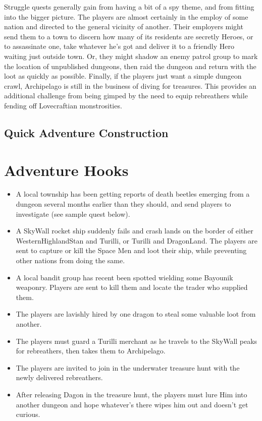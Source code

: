\documentclass[12pt,a4paper,twocolumn]{article}
\begin{document}
\begin{itemize}
Struggle quests generally gain from having a bit of a spy theme, and from fitting into the bigger picture.  The players are almost certainly in the employ of some nation and directed to the general vicinity of another.  Their employers might send them to a town to discern how many of its residents are secretly Heroes, or to assassinate one, take whatever he's got and deliver it to a friendly Hero waiting just outside town.  Or, they might shadow an enemy patrol group to mark the location of unpublished dungeons, then raid the dungeon and return with the loot as quickly as possible.  Finally, if the players just want a simple dungeon crawl, Archipelago is still in the business of diving for treasures.  This provides an additional challenge from being gimped by the need to equip rebreathers while fending off Lovecraftian monstrosities.  

\end{itemize} 

\subsection{Quick Adventure Construction}

\section{Adventure Hooks}

\begin{itemize}

\item A local township has been getting reports of death beetles emerging from a dungeon several months earlier than they should, and send players to investigate (see sample quest below).

\item A SkyWall rocket ship suddenly fails and crash lands on the border of either WesternHighlandStan and Turilli, or Turilli and DragonLand.  The players are sent to capture or kill the Space Men and loot their ship, while preventing other nations from doing the same.

\item A local bandit group has recent been spotted wielding some Bayounik weaponry.  Players are sent to kill them and locate the trader who supplied them.

\item The players are lavishly hired by one dragon to steal some valuable loot from another.

\item The players must guard a Turilli merchant as he travels to the SkyWall peaks for rebreathers, then takes them to Archipelago.

\item The players are invited to join in the underwater treasure hunt with the newly delivered rebreathers.

\item After releasing Dagon in the treasure hunt, the players must lure Him into another dungeon and hope whatever's there wipes him out and doesn't get curious.

\end{itemize}
\end{document}

